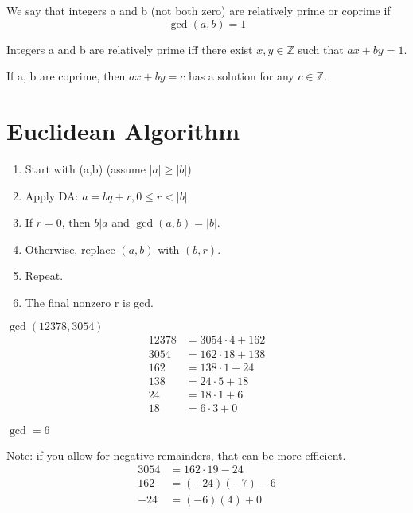     \begin{definition}
        We say that integers a and b (not both zero) are relatively prime or coprime if
        \[
            \gcd(a,b) = 1
        \]
    \end{definition}
    \begin{corollary}
        Integers a and b are relatively prime iff there exist $x,y\in\mathbb{Z}$ such that
        $ax+by=1$.
    \end{corollary}
    \begin{corollary}
        If a, b are coprime, then $ax+by=c$ has a solution for any $c\in\mathbb{Z}$.
    \end{corollary}

\section{Euclidean Algorithm}
    \begin{enumerate}
        \item Start with (a,b) (assume $|a|\geq |b|$)
        \item Apply DA: $a = bq+r, 0 \leq r < |b|$
        \item If $r=0$, then $b|a$ and $\gcd(a,b) = |b|$.
        \item Otherwise, replace $(a,b)$ with $(b,r)$.
        \item Repeat.
        \item The final nonzero r is gcd.
    \end{enumerate}
    \begin{example}
        $\gcd(12378,3054)$
        \begin{align*}
            12378 & = 3054\cdot 4 + 162 \\
            3054 & = 162\cdot 18 + 138 \\
            162 & = 138\cdot 1 + 24 \\
            138 & = 24\cdot 5 + 18 \\
            24 & = 18\cdot 1 + 6 \\
            18 & = 6\cdot 3 + 0 
        \end{align*}
        \begin{center}
            $\gcd = 6$
        \end{center}
        Note: if you allow for negative remainders, that can be more efficient.
        \begin{align*}
            3054 & = 162\cdot 19 - 24 \\
            162 & = (-24)(-7) - 6 \\
            -24 & = (-6)(4) + 0
        \end{align*}
    \end{example}

